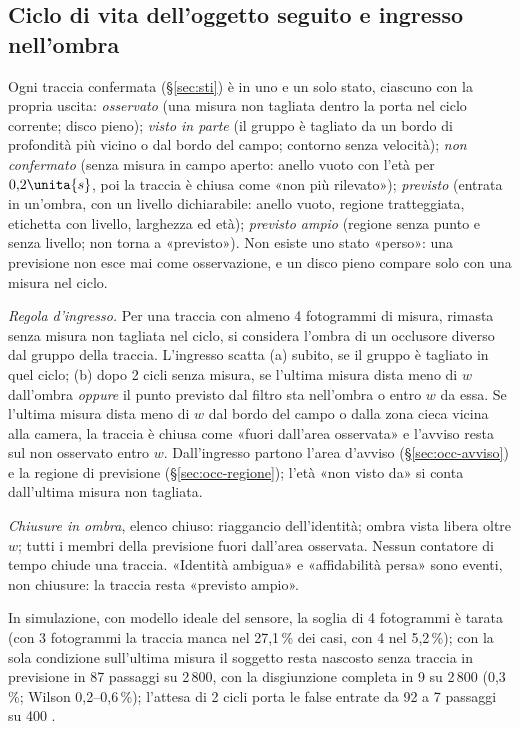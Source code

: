 \subsection{Ciclo di vita dell'oggetto seguito e ingresso nell'ombra}\label{sec:occ-ciclo}

Ogni traccia confermata (\S\ref{sec:sti}) è in uno e un solo stato, ciascuno con la propria uscita: \emph{osservato} (una misura non tagliata dentro la porta nel ciclo corrente; disco pieno); \emph{visto in parte} (il gruppo è tagliato da un bordo di profondità più vicino o dal bordo del campo; contorno senza velocità); \emph{non confermato} (senza misura in campo aperto: anello vuoto con l'età per $0{,}2\unita{s}$, poi la traccia è chiusa come «non più rilevato»); \emph{previsto} (entrata in un'ombra, con un livello dichiarabile: anello vuoto, regione tratteggiata, etichetta con livello, larghezza ed età); \emph{previsto ampio} (regione senza punto e senza livello; non torna a «previsto»). Non esiste uno stato «perso»: una previsione non esce mai come osservazione, e un disco pieno compare solo con una misura nel ciclo.

\emph{Regola d'ingresso.} Per una traccia con almeno 4 fotogrammi di misura, rimasta senza misura non tagliata nel ciclo, si considera l'ombra di un occlusore diverso dal gruppo della traccia. L'ingresso scatta (a) subito, se il gruppo è tagliato in quel ciclo; (b) dopo 2 cicli senza misura, se l'ultima misura dista meno di $w$ dall'ombra \emph{oppure} il punto previsto dal filtro sta nell'ombra o entro $w$ da essa. Se l'ultima misura dista meno di $w$ dal bordo del campo o dalla zona cieca vicina alla camera, la traccia è chiusa come «fuori dall'area osservata» e l'avviso resta sul non osservato entro $w$. Dall'ingresso partono l'area d'avviso (\S\ref{sec:occ-avviso}) e la regione di previsione (\S\ref{sec:occ-regione}); l'età «non visto da» si conta dall'ultima misura non tagliata.

\emph{Chiusure in ombra}, elenco chiuso: riaggancio dell'identità; ombra vista libera oltre $w$; tutti i membri della previsione fuori dall'area osservata. Nessun contatore di tempo chiude una traccia. «Identità ambigua» e «affidabilità persa» sono eventi, non chiusure: la traccia resta «previsto ampio».

In simulazione, con modello ideale del sensore, la soglia di 4 fotogrammi è tarata (con 3 fotogrammi la traccia manca nel 27,1\,\% dei casi, con 4 nel 5,2\,\%); con la sola condizione sull'ultima misura il soggetto resta nascosto senza traccia in previsione in 87 passaggi su 2\,800, con la disgiunzione completa in 9 su 2\,800 (0,3\,\%; Wilson 0,2--0,6\,\%); l'attesa di 2 cicli porta le false entrate da 92 a 7 passaggi su 400 .

